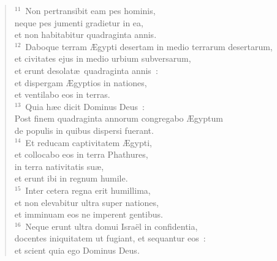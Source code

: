 \begin{verse}
${}^{11}$~Non pertransibit eam pes hominis,\\ neque pes jumenti gradietur in ea,\\ et non habitabitur quadraginta annis.\\
${}^{12}$~Daboque terram \AE gypti desertam in medio terrarum desertarum,\\ et civitates ejus in medio urbium subversarum,\\ et erunt desolat\ae\ quadraginta annis~:\\ et dispergam \AE gyptios in nationes,\\ et ventilabo eos in terras.\\
${}^{13}$~Quia h\ae c dicit Dominus Deus~:\\ Post finem quadraginta annorum congregabo \AE gyptum\\ de populis in quibus dispersi fuerant.\\
${}^{14}$~Et reducam captivitatem \AE gypti,\\ et collocabo eos in terra Phathures,\\ in terra nativitatis su\ae ,\\ et erunt ibi in regnum humile.\\
${}^{15}$~Inter cetera regna erit humillima,\\ et non elevabitur ultra super nationes,\\ et imminuam eos ne imperent gentibus.\\
${}^{16}$~Neque erunt ultra domui Isra\"el in confidentia,\\ docentes iniquitatem ut fugiant, et sequantur eos~:\\ et scient quia ego Dominus Deus.\end{verse}


